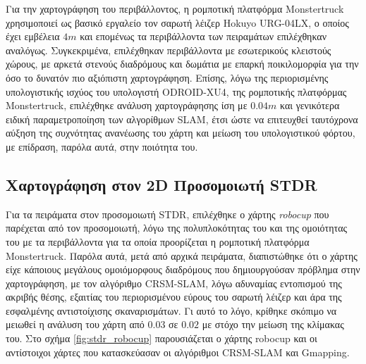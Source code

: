 \bigskip
Για την χαρτογράφηση του περιβάλλοντος, η ρομποτική πλατφόρμα Monstertruck χρησιμοποιεί ως βασικό εργαλείο τον σαρωτή λέιζερ Hokuyo URG-04LX, ο οποίος έχει εμβέλεια $4m$ και επομένως τα περιβάλλοντα των πειραμάτων επιλέχθηκαν αναλόγως. Συγκεκριμένα, επιλέχθηκαν περιβάλλοντα με εσωτερικούς κλειστούς χώρους, με αρκετά στενούς διαδρόμους και δωμάτια με επαρκή ποικιλομορφία για την όσο το δυνατόν πιο αξιόπιστη χαρτογράφηση. Επίσης, λόγω της περιορισμένης υπολογιστικής ισχύος του υπολογιστή ODROID-XU4, της ρομποτικής πλατφόρμας Monstertruck, επιλέχθηκε ανάλυση χαρτογράφησης ίση με $0.04m$ και γενικότερα ειδική παραμετροποίηση των αλγορίθμων SLAM, έτσι ώστε να επιτευχθεί ταυτόχρονα αύξηση της συχνότητας ανανέωσης του χάρτη και μείωση του υπολογιστικού φόρτου, με επίδραση, παρόλα αυτά, στην ποιότητα του.

\subsection{Χαρτογράφηση στον 2D Προσομοιωτή STDR} \label{ssec:stdr_slam}
Για τα πειράματα στον προσομοιωτή STDR, επιλέχθηκε ο χάρτης \textit{robocup} που παρέχεται από τον προσομοιωτή, λόγω της πολυπλοκότητας του και της ομοιότητας του με τα περιβάλλοντα για τα οποία προορίζεται η ρομποτική πλατφόρμα Monstertruck. Παρόλα αυτά, μετά από αρχικά πειράματα, διαπιστώθηκε ότι ο χάρτης είχε κάποιους μεγάλους ομοιόμορφους διαδρόμους που δημιουργούσαν πρόβλημα στην χαρτογράφηση, με τον αλγόριθμο CRSM-SLAM, λόγω αδυναμίας εντοπισμού της ακριβής θέσης, εξαιτίας του περιορισμένου εύρους του σαρωτή λέιζερ και άρα της εσφαλμένης αντιστοίχισης σκαναρισμάτων. Γι αυτό το λόγο, κρίθηκε σκόπιμο να μειωθεί η ανάλυση του χάρτη από $0.03$ σε $0.02$ με στόχο την μείωση της κλίμακας του. Στο σχήμα \ref{fig:stdr_robocup} παρουσιάζεται ο χάρτης robocup και οι αντίστοιχοι χάρτες που κατασκεύασαν οι αλγόριθμοι CRSM-SLAM και Gmapping.

